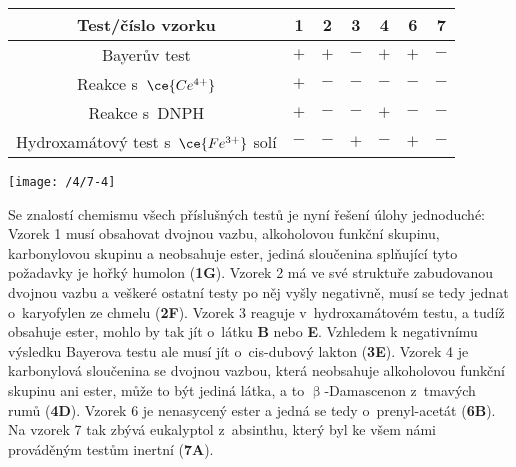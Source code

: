\documentclass{book}
\renewenvironment{quotation}{\par}{\par} %
\begin{document}
\begin{quotation}
\begin{center}
\begin{tabular}{c|c|c|c|c|c|c}
Test/číslo vzorku & 1 & 2 & 3 & 4 & 6 & 7\tabularnewline
\hline 
\hline 
Bayerův test & $+$ & $+$ & $-$ & $+$ & $+$ & $-$\tabularnewline
\hline 
Reakce s~$\ce{Ce^{4+}}$ & $+$ & $-$ & $-$ & $-$ & $-$ & $-$\tabularnewline
\hline 
Reakce s~DNPH & $+$ & $-$ & $-$ & $+$ & $-$ & $-$\tabularnewline
\hline 
Hydroxamátový test s~$\ce{Fe^{3+}}$ solí & $-$ & $-$ & $+$ & $-$ & $+$ & $-$\tabularnewline

\end{tabular}
\end{center}


\begin{center}
\texttt{[image: /4/7-4]}
\end{center}
\end{quotation} \dotfill \par 

Se znalostí chemismu všech příslušných testů je nyní řešení úlohy
jednoduché: Vzorek 1 musí obsahovat dvojnou vazbu, alkoholovou funkční
skupinu, karbonylovou skupinu a neobsahuje ester, jediná sloučenina
splňující tyto požadavky je hořký humolon (\textbf{1G}). Vzorek 2
má ve své struktuře zabudovanou dvojnou vazbu a veškeré ostatní testy
po něj vyšly negativně, musí se tedy jednat o~karyofylen ze chmelu
(\textbf{2F}). Vzorek 3 reaguje v~hydroxamátovém testu, a tudíž obsahuje
ester, mohlo by tak jít o~látku \textbf{B} nebo \textbf{E}. Vzhledem
k negativnímu výsledku Bayerova testu ale musí jít o~cis-dubový lakton
(\textbf{3E}). Vzorek 4 je karbonylová sloučenina se dvojnou vazbou,
která neobsahuje alkoholovou funkční skupinu ani ester, může to být
jediná látka, a to $\upbeta$-Damascenon z~tmavých rumů (\textbf{4D}).
Vzorek 6 je nenasycený ester a jedná se tedy o~prenyl-acetát (\textbf{6B}).
Na vzorek 7 tak zbývá eukalyptol z~absinthu, který byl ke všem námi
prováděným testům inertní (\textbf{7A}). 
\end{document}
